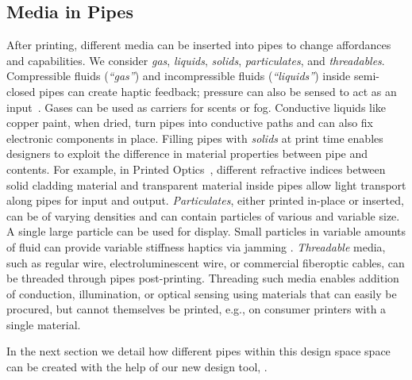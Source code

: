 \subsection{Media in Pipes}
After printing, different media can be inserted into pipes to change affordances and capabilities. We consider \emph{gas}, \emph{liquids}, \emph{solids}, \emph{particulates}, and \emph{threadables}. 
%
Compressible fluids (\emph{``gas''}) and incompressible fluids (\emph{``liquids''})  inside semi-closed pipes can create haptic feedback; pressure can also be sensed to act as an input~\cite{Slyper-shape}. Gases can be used as carriers for scents or fog. Conductive liquids like copper paint, when dried, turn pipes into conductive paths and can also fix electronic components in place.
%
Filling pipes with \emph{solids} at print time enables designers to exploit the difference in material properties between pipe and contents. For example, in Printed Optics~\cite{Willis-printedoptics}, different refractive indices between solid cladding material and transparent material inside pipes allow light transport along pipes for input and output.
%
\emph{Particulates}, either printed in-place or inserted, can be of varying densities and can contain particles of various and variable size.  A single large particle can be used for display.  Small particles in variable amounts of fluid can provide variable stiffness haptics via jamming \cite{Follmer-jamming}.
%
\emph{Threadable} media, such as regular wire, electroluminescent wire, or commercial fiberoptic cables, can be threaded through pipes post-printing. Threading such media enables addition of conduction, illumination, or optical sensing using materials that can easily be procured, but cannot themselves be printed, e.g., on consumer printers with a single material. 

In the next section we detail how different pipes within this design space space can be created with the help of our new design tool, \systemnamenospace.
